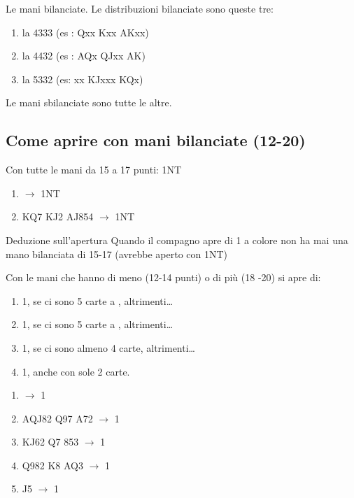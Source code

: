 \documentclass[../corsofiori.tex]{subfiles}
\begin{document}
Le mani bilanciate. Le distribuzioni bilanciate sono queste tre:
\begin{enumerate}[label=-]
\item la 4333
    (es :   {Qxx}  {Kxx} {AKxx})
\item la 4432
    (es :   {AQx}   {QJxx}   {AK})
\item la 5332
    (es:   {xx}   {KJxxx}   {KQx})
\end{enumerate}

Le mani sbilanciate sono tutte le altre.

\subsection{Come aprire con mani bilanciate (12-20)}
Con tutte le mani da 15 a 17 punti: 1NT


\begin{enumerate}[label={}]
\item {} $\rightarrow$ 1NT

\item {} {KQ7} {KJ2} {AJ854} $\rightarrow$ 1NT
\end{enumerate}

\begin{regola}{Deduzione sull'apertura}
    Quando il compagno apre di 1 a colore non ha mai una mano bilanciata
di 15-17 (avrebbe aperto con 1NT)
\end{regola}

Con le mani che hanno di meno (12-14 punti) o di più (18 -20) si apre di:
\begin{enumerate}
    \item 1\Sp, se ci sono 5 carte a \Sp, altrimenti\ldots
    \item 1\He, se ci sono 5 carte a \He, altrimenti\ldots
    \item 1\Di, se ci sono almeno 4 carte, altrimenti\ldots
    \item 1\Cl, anche con sole 2 carte.
\end{enumerate}

\begin{enumerate}[label={}]
\item {} $\rightarrow$ 1\Cl

\item {} {AQJ82} {Q97} {A72} $\rightarrow$ 1\He

\item {} {KJ62} {Q7} {853} $\rightarrow$ 1\Cl

\item {} {Q982} {K8} {AQ3} $\rightarrow$ 1\Cl

\item {} {J5} $\rightarrow$ 1\Di
\end{enumerate}
\end{document}

